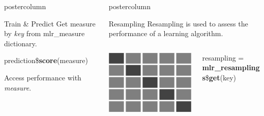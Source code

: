\documentclass{beamer}
\newlength{\columnheight} %
\begin{document}
\begin{frame}[fragile]{}
\begin{columns}
\begin{column}{.245\textwidth}
\begin{beamercolorbox}[center]{postercolumn}
\begin{minipage}{.98\textwidth}
{\begin{myblock}{Train \& Predict}
						\hspace*{1ex}Get measure by \textit{key} from mlr\_measure dictionary.
						\\
						\begin{codebox}
							prediction\$\textbf{score}(measure)
						\end{codebox}
						\hspace*{1ex}Access performance with \textit{measure}.
					\end{myblock}
										}
			\end{minipage}
		\end{beamercolorbox}
	\end{column}
		\begin{column}{.245\textwidth}
		\begin{beamercolorbox}[center]{postercolumn}
			\begin{minipage}{.98\textwidth}
				\parbox[t][\columnheight]{\textwidth}{
					\begin{myblock}{Resampling}
						Resampling is used to assess the performance of a learning algorithm.
						\\[\baselineskip]
						\begin{minipage}{\textwidth}
							\begin{columns}[T]
								\begin{column}{0.2\textwidth}
									\includegraphics[width=\textwidth]{img/cross_validation.png}
								\end{column}
								\begin{column}{0.8\textwidth}
										\begin{codebox}
										resampling = \textbf{mlr\_resamplings}\$\textbf{get}(key)

\end{codebox}
\end{column}
\end{columns}
\end{minipage}
\end{myblock}}
\end{minipage}
\end{beamercolorbox}
\end{column}
\end{columns}
\end{frame}
\end{document}
